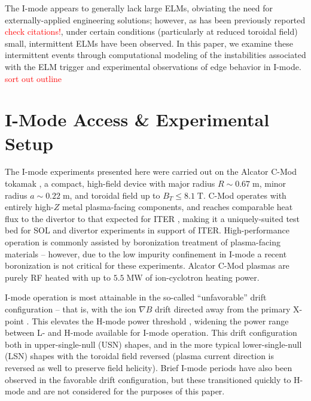 \documentclass[12pt,floatfix,showpacs]{revtex4-1}
\newcommand{\note}[1]{\textcolor{red}{#1}}
\newcommand{\gnote}[1]{\marginpar{\textcolor{red}{\scriptsize{#1}}}}
\begin{document}
The I-mode appears to generally lack large ELMs, obviating the need for externally-applied engineering solutions; however, as has been previously reported \cite{Whyte2010,Walk2014b}\note{check citations!}, under certain conditions (particularly at reduced toroidal field) small, intermittent ELMs have been observed.
In this paper, we examine these intermittent events through computational modeling of the instabilities associated with the ELM trigger and experimental observations of edge behavior in I-mode.  \note{sort out outline}

\section{I-Mode Access \& Experimental Setup}\label{sec:setup}

The I-mode experiments presented here were carried out on the Alcator C-Mod tokamak \cite{Hutchinson1994}, a compact, high-field device with major radius $R \sim 0.67 \;\mbox{m}$, minor radius $a \sim 0.22 \;\mbox{m}$, and toroidal field up to $B_T \le 8.1 \;\mbox{T}$.  
C-Mod operates with entirely high-$Z$ metal plasma-facing components, and reaches comparable heat flux to the divertor to that expected for ITER \cite{Loarte2007,Terry2007,LaBombard2011}, making it a uniquely-suited test bed for SOL and divertor experiments in support of ITER\gnote{too much?}.  
High-performance operation is commonly assisted by boronization treatment of plasma-facing materials -- however, due to the low impurity confinement in I-mode a recent boronization is not critical for these experiments.  
Alcator C-Mod plasmas are purely RF heated with up to $5.5 \;\mbox{MW}$ of ion-cyclotron heating power.

I-mode operation is most attainable in the so-called ``unfavorable'' drift configuration -- that is, with the ion $\nabla B$ drift directed away from the primary X-point \cite{Whyte2010}.  
This elevates the H-mode power threshold \cite{Hubbard2007}, widening the power range between L- and H-mode available for I-mode operation.  
This drift configuration both in upper-single-null (USN) shapes, and in the more typical lower-single-null (LSN) shapes with the toroidal field reversed (plasma current direction is reversed as well to preserve field helicity)\gnote{clarify?}.  
Brief I-mode periods have also been observed in the favorable drift configuration, but these transitioned quickly to H-mode and are not considered for the purposes of this paper.
\end{document}
